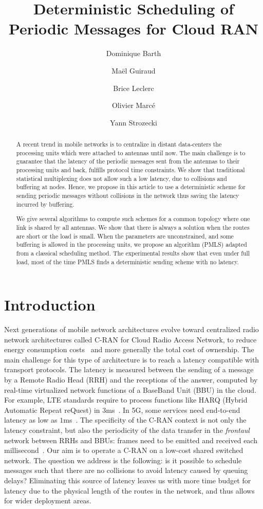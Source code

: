 \documentclass[a4paper,10pt]{IEEEtran}
\title{Deterministic Scheduling of Periodic Messages for Cloud RAN}
\author[1]{Dominique Barth}
\author[1]{Ma\"el Guiraud}
\author[2]{Brice Leclerc}
\author[2]{Olivier Marc\'e}
\author[1]{Yann Strozecki}
\affil[1]{David Laboratory, UVSQ}
\affil[2]{Nokia Bell Labs France}
\begin{document}
\maketitle

\begin{abstract}
A recent trend in mobile networks is to centralize in distant data-centers the processing units which were attached to 
antennas until now. The main challenge is to guarantee that the latency of the periodic messages sent from the antennas to their processing
units and back, fulfills protocol time constraints. We show that traditional statistical multiplexing does not allow such a low latency, due to collisions and buffering at nodes. Hence, we propose in this article to use a deterministic scheme for sending periodic messages without collisions in the network thus saving the latency incurred by buffering.

We give several algorithms to compute such schemes for a common topology where one link is shared by all antennas.
We show that there is always a solution when the routes are short or the load is small. When the parameters are unconstrained,
and some buffering is allowed in the processing units, we propose an algorithm (PMLS) adapted from a classical scheduling method.
The experimental results show that even under full load, most of the time PMLS finds a deterministic sending scheme with no latency.
\end{abstract}


\section{Introduction}

Next generations of mobile network architectures evolve toward centralized radio network architectures called C-RAN for Cloud Radio Access Network, to reduce energy consumption costs~\cite{mobile2011c} and more generally the total cost of ownership. The main challenge for this type of architecture is to reach a latency compatible with transport protocols. The latency is measured between the sending of a message by a Remote Radio Head (RRH) and the receptions of the answer, computed by real-time virtualized network functions of a BaseBand Unit (BBU) in the cloud. For example, LTE standards require to process functions like HARQ (Hybrid Automatic Repeat reQuest) in $3$ms~\cite{bouguen2012lte}. In 5G, some services need end-to-end latency as low as $1$ms~\cite{3gpp5g}. The specificity of the C-RAN context is not only the latency constraint, but also the periodicity of the data transfer in the \emph{frontaul} network between RRHs and BBUs: frames need to be emitted and received each millisecond~\cite{bouguen2012lte}.
Our aim is to operate a C-RAN on a low-cost shared switched network.
The question we address is the following: is it possible to schedule messages such that there are no collisions to avoid latency caused by queuing delays? 
Eliminating this source of latency leaves us with more time budget for latency due to the physical length of the routes in the network, and thus allows for wider deployment areas.
\end{document}
